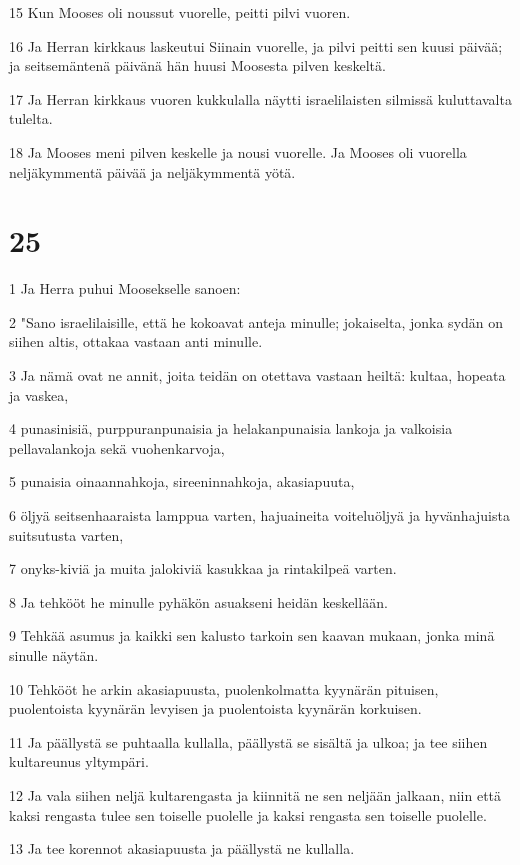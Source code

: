 \par 15 Kun Mooses oli noussut vuorelle, peitti pilvi vuoren.
\par 16 Ja Herran kirkkaus laskeutui Siinain vuorelle, ja pilvi peitti sen kuusi päivää; ja seitsemäntenä päivänä hän huusi Moosesta pilven keskeltä.
\par 17 Ja Herran kirkkaus vuoren kukkulalla näytti israelilaisten silmissä kuluttavalta tulelta.
\par 18 Ja Mooses meni pilven keskelle ja nousi vuorelle. Ja Mooses oli vuorella neljäkymmentä päivää ja neljäkymmentä yötä.

\chapter{25}

\par 1 Ja Herra puhui Moosekselle sanoen:
\par 2 "Sano israelilaisille, että he kokoavat anteja minulle; jokaiselta, jonka sydän on siihen altis, ottakaa vastaan anti minulle.
\par 3 Ja nämä ovat ne annit, joita teidän on otettava vastaan heiltä: kultaa, hopeata ja vaskea,
\par 4 punasinisiä, purppuranpunaisia ja helakanpunaisia lankoja ja valkoisia pellavalankoja sekä vuohenkarvoja,
\par 5 punaisia oinaannahkoja, sireeninnahkoja, akasiapuuta,
\par 6 öljyä seitsenhaaraista lamppua varten, hajuaineita voiteluöljyä ja hyvänhajuista suitsutusta varten,
\par 7 onyks-kiviä ja muita jalokiviä kasukkaa ja rintakilpeä varten.
\par 8 Ja tehkööt he minulle pyhäkön asuakseni heidän keskellään.
\par 9 Tehkää asumus ja kaikki sen kalusto tarkoin sen kaavan mukaan, jonka minä sinulle näytän.
\par 10 Tehkööt he arkin akasiapuusta, puolenkolmatta kyynärän pituisen, puolentoista kyynärän levyisen ja puolentoista kyynärän korkuisen.
\par 11 Ja päällystä se puhtaalla kullalla, päällystä se sisältä ja ulkoa; ja tee siihen kultareunus yltympäri.
\par 12 Ja vala siihen neljä kultarengasta ja kiinnitä ne sen neljään jalkaan, niin että kaksi rengasta tulee sen toiselle puolelle ja kaksi rengasta sen toiselle puolelle.
\par 13 Ja tee korennot akasiapuusta ja päällystä ne kullalla.
